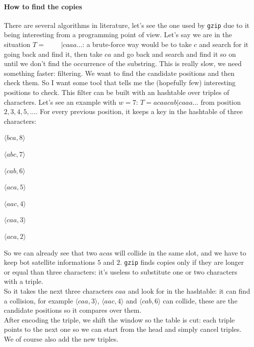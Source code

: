 \documentclass[10pt]{report}
\begin{document}
\paragraph{How to find the copies} There are several algorithms in literature, let's see the one used by \texttt{gzip} due to it being interesting from a programming point of view. Let's say we are in the situation $T = \:\:\:\:\:\:\:\:\:\:|caaa\ldots$: a brute-force way would be to take $c$ and search for it going back and find it, then take $ca$ and go back and search and find it so on until we don't find the occurrence of the substring. This is really slow, we need something faster: filtering. We want to find the candidate positions and then check them. So I want some tool that tells me the (hopefully few) interesting positions to check. This filter can be built with an hashtable over triples of characters. Let's see an example with $w=7$: $T = acaacab|caaa\ldots$ from position $2,3,4,5,\ldots$. For every previous position, it keeps a key in the hashtable of three characters:\begin{list}{}{}
	\item $\langle bca,8\rangle$
	\item $\langle abc,7\rangle$
	\item $\langle cab,6\rangle$
	\item $\langle aca,5\rangle$
	\item $\langle aac,4\rangle$
	\item $\langle caa,3\rangle$
	\item $\langle aca,2\rangle$
\end{list}
So we can already see that two $aca$s will collide in the same slot, and we have to keep bot satellite informations $5$ and $2$. \texttt{gzip} finds copies only if they are longer or equal than three characters: it's useless to substitute one or two characters with a triple.\\
So it takes the next three characters $caa$ and look for in the hashtable: it can find a collision, for example $\langle caa,3\rangle$, $\langle aac, 4\rangle$ and $\langle cab,6\rangle$ can collide, these are the candidate positions so it compares over them.\\
After encoding the triple, we shift the window so the table is cut: each triple points to the next one so we can start from the head and simply cancel triples. We of course also add the new triples.
\end{document}
